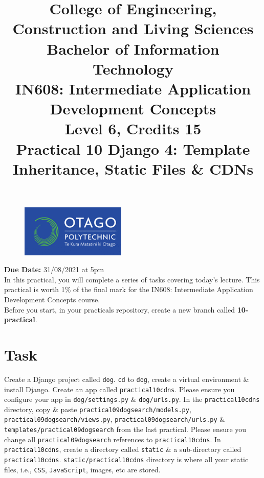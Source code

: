 \documentclass{article}
\author{}
\begin{document}
\begin{figure}
	\centering
	\includegraphics[width=50mm]{./img/logo.png}
\end{figure}

\title{College of Engineering, Construction and Living Sciences\\Bachelor of Information Technology\\IN608: Intermediate Application Development Concepts\\Level 6, Credits 15\\\textbf{Practical 10 Django 4: Template Inheritance, Static Files \& CDNs}} 
\date{}
\maketitle

\textbf{Due Date:} 31/08/2021 at 5pm \\

In this practical, you will complete a series of tasks covering today's lecture. This practical is worth 1\% of the final mark for the IN608: Intermediate Application Development Concepts course. \\

Before you start, in your practicals repository, create a new branch called \textbf{10-practical}.

\section*{Task} 
Create a Django project called \texttt{dog}. \texttt{cd} to \texttt{dog}, create a virtual environment \& install Django. Create an app called \texttt{practical10cdns}. Please ensure you configure your app in \texttt{dog/settings.py} \& \texttt{dog/urls.py}. In the \texttt{practical10cdns} directory, copy \& paste \texttt{practical09dogsearch/models.py}, \texttt{practical09dogsearch/views.py}, \texttt{practical09dogsearch/urls.py} \& \texttt{templates/practical09dogsearch} from the last practical. Please ensure you change all \texttt{practical09dogsearch} references to \texttt{practical10cdns}. In \texttt{practical10cdns}, create a directory called \texttt{static} \& a sub-directory called  \texttt{practical10cdns}. \texttt{static/practical10cdns} directory is where all your static files, i.e., \texttt{CSS}, \texttt{JavaScript}, images, etc are stored. \\
\end{document}

